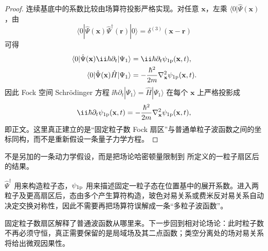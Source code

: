 \begin{proof}
连续基底中的系数比较由场算符投影严格实现。对任意 \(\mathbf x\)，左乘 \(\langle0|\hat\Psi(\mathbf x)\)，由
\begin{equation*}
\langle0|\hat\Psi(\mathbf x)
\hat\Psi^\dagger(\mathbf r)|0\rangle
=\delta^{(3)}(\mathbf x-\mathbf r)
\end{equation*}
可得
\begin{align*}
\langle0|\hat\Psi(\mathbf x)
\ii\hbar\partial_t|\Psi_1\rangle
&=\ii\hbar\partial_t\psi_{\rm 1p}(\mathbf x,t),\\
\langle0|\hat\Psi(\mathbf x)
\hat H|\Psi_1\rangle
&=-\frac{\hbar^2}{2m}\nabla_{\mathbf x}^2
\psi_{\rm 1p}(\mathbf x,t).
\end{align*}
因此 Fock 空间 Schr\"odinger 方程 \(\ii\hbar\partial_t|\Psi_1\rangle=\hat H|\Psi_1\rangle\) 在每个 \(\mathbf x\) 上严格投影成
\begin{equation*}
\ii\hbar\partial_t\psi_{\rm 1p}(\mathbf x,t)
=-\frac{\hbar^2}{2m}\nabla_{\mathbf x}^2\psi_{\rm 1p}(\mathbf x,t),
\end{equation*}
即正文。这里真正建立的是“固定粒子数 Fock 扇区”与普通单粒子波函数之间的坐标同构，而不是重新假设一条量子力学方程。
\end{proof}

 不是另加的一条动力学假设，而是把场论哈密顿量限制到 所定义的一粒子扇区后的结果。

$\hat\Psi^\dagger$ 用来构造粒子态，$\psi_{\rm 1p}$ 用来描述固定一粒子态在位置基中的展开系数。进入两粒子及更高扇区后，态由多个产生算符构造，玻色对易关系或费米反对易关系自动决定交换对称性，因此不需要再把场算符误解成一条“多粒子波函数”。


固定粒子数扇区解释了普通波函数从哪里来。下一步回到相对论场论：此时粒子数不再必须守恒，真正需要保留的是局域场及其二点函数；类空分离处的场对易关系将给出微观因果性。

